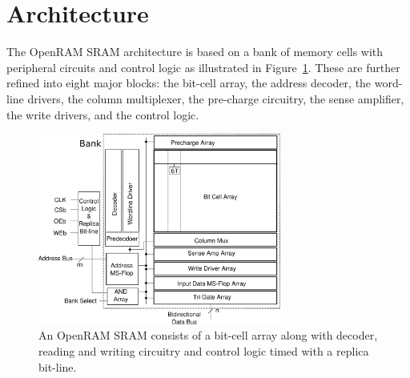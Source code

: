 \section{Architecture}
\label{sec:architecture}

The OpenRAM SRAM architecture is based on a bank of memory cells
with peripheral circuits and control logic as illustrated in
Figure~\ref{fig:structure}. These are further refined into eight major
blocks: the bit-cell array, the address decoder, the word-line drivers,
the column multiplexer, the pre-charge circuitry, the sense amplifier,
the write drivers, and the control logic.

\begin{figure}[tb]
\centering
\includegraphics[width=8cm]{./figs/sram_structure.pdf}
\caption{An OpenRAM SRAM consists of a bit-cell array along with decoder, 
  reading and writing circuitry and control logic timed with a replica
  bit-line.
\label{fig:structure}}
\end{figure}


